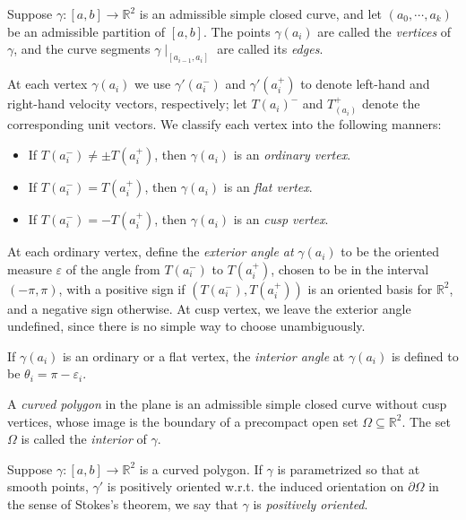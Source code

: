 \begin{definition}
  \label{definition-vertices}
  \label{definition-edges}
  \label{definition-angle}
  Suppose \( \gamma: [a, b] \to \mathbb{R}^2 \) is an admissible simple closed curve, and let \( (a_0, \cdots, a_k) \)  be an admissible partition of \( [a, b] \).
  The points \( \gamma(a_i) \) are called the \emph{vertices} of \( \gamma \), and the curve segments \( \gamma \mid_{[a_{i - 1}, a_i]} \) are called its \emph{edges}.

  At each vertex \( \gamma(a_i) \) we use \( \gamma'(a_i^-) \) and \( \gamma'(a_i^+) \) to denote left-hand and right-hand velocity vectors, respectively;
  let \( T(a_i)^- \) and \( T_(a_i)^{+} \) denote the corresponding unit vectors.
  We classify each vertex into the following manners:
  \begin{itemize}
    \item If \( T(a_i^-) \neq \pm T(a_i^+) \), then \( \gamma(a_i) \) is an \emph{ordinary vertex}.
    \item If \( T(a_i^-) = T(a_i^+) \), then \( \gamma(a_i) \) is an \emph{flat vertex}.
    \item If \( T(a_i^-) = - T(a_i^+) \), then \( \gamma(a_i) \) is an \emph{cusp vertex}.
  \end{itemize}

At each ordinary vertex, define the \emph{exterior angle at} \( \gamma(a_i) \) to be the oriented measure \( \varepsilon \) of the angle from \( T(a_i^-) \) to \( T(a_i^+) \), chosen to be in the interval \( (-\pi, \pi) \), with a positive sign if \( (T(a_i^-), T(a_i^+)) \) is an oriented basis for \( \mathbb{R}^2 \), and a negative sign otherwise.
At cusp vertex, we leave the exterior angle undefined, since there is no simple way to choose unambiguously.

If \( \gamma(a_i) \) is an ordinary or a flat vertex, the \emph{interior angle} at \( \gamma(a_i) \) is defined to be \( \theta_i = \pi - \varepsilon_i \).
\end{definition}

\begin{definition}
  \label{definition-curved-polygon}
  A \emph{curved polygon} in the plane is an admissible simple closed curve without cusp vertices, whose image is the boundary of a precompact open set \( \Omega \subseteq \mathbb{R}^2 \).
  The set \( \Omega \) is called the \emph{interior} of \( \gamma \).
\end{definition}

\begin{definition}
  \label{definition-curved-polygon-positively-oriented}
  Suppose \( \gamma:[a, b] \to \mathbb{R}^2 \) is a curved polygon.
  If \( \gamma \) is parametrized so that at smooth points, \( \gamma' \) is positively oriented w.r.t. the induced orientation on \( \partial \Omega \) in the sense of Stokes's theorem, we say that \( \gamma \) is \emph{positively oriented}.

\end{definition}

